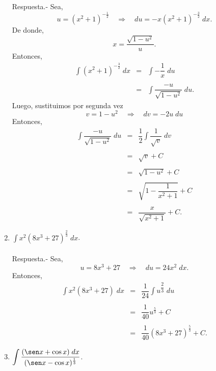 \begin{enumerate}[\bfseries 1.]
	Respuesta.-\; Sea, 
	$$u=\left(x^2+1\right)^{-\frac{1}{2}}\quad \Rightarrow \quad du=-x\left(x^2+1\right)^{-\frac{3}{2}}\; dx.$$
	De donde,
	$$x=\dfrac{\sqrt{1-u^2}}{u}.$$
	Entonces,
	$$\begin{array}{rcl}
	    \displaystyle\int (x^2+1)^{-\frac{3}{2}}\; dx &=& \displaystyle\int -\dfrac{1}{x}\; du\\\\
							  &=&\displaystyle\int \dfrac{-u}{\sqrt{1-u^2}}\; du.
	\end{array}$$
	Luego, sustituimos por segunda vez
	$$v=1-u^2\quad \Rightarrow \quad dv=-2u\; du$$
	Entonces,
	$$\begin{array}{rcl}
	    \displaystyle\int \dfrac{-u}{\sqrt{1-u^2}}\; du &=& \dfrac{1}{2}\displaystyle\int \dfrac{1}{\sqrt{v}}\; dv\\\\
							    &=&\sqrt{v}+C\\\\
							    &=&\sqrt{1-u^2}+C\\\\
							    &=&\sqrt{1-\dfrac{1}{x^2+1}}+C\\\\
							    &=&\dfrac{x}{\sqrt{x^2+1}}+C.
	\end{array}$$
	\vspace{.5cm}

    \item $\displaystyle\int x^2(8x^3+27)^{\frac{2}{3}} \; dx$.\\\\

	Respuesta.-\; Sea,
	$$u=8x^3+27\quad \Rightarrow \quad du=24x^2\; dx.$$
	Entonces,
	$$\begin{array}{rcl}
	    \displaystyle\int x^2\left(8x^3+27\right)\; dx &=&\dfrac{1}{24} \displaystyle\int u^{\dfrac{2}{3}}\; du\\\\
							   &=&\dfrac{1}{40}u^{\frac{5}{3}}+C\\\\
							   &=& \dfrac{1}{40}\left(8x^3+27\right)^{\frac{5}{3}}+C.
	\end{array}$$
	\vspace{.5cm}

    \item $\displaystyle\int \dfrac{(\sen x + \cos x)\; dx}{(\sen x - \cos x)^{\frac{1}{3}}} $.\\\\


\end{enumerate}
